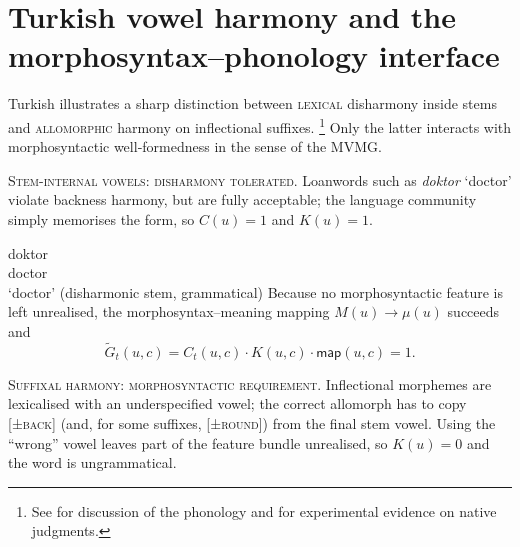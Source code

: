 \documentclass[12pt,letterpaper]{article}
\newcommand{\term}[1]{\textsc{#1}}
\newcommand{\mention}[1]{\textit{#1}}
\begin{document}
\newpage
\appendix

\section{Turkish vowel harmony and the morphosyntax--phonology interface}
\label{app:turkish-harmony}

Turkish illustrates a sharp distinction between \term{lexical} disharmony inside stems and
\term{allomorphic} harmony on inflectional suffixes.%
\footnote{See \autocite{Sezer1981,KabakVogel2001} for discussion of the phonology and \autocite{Arik2015} for experimental evidence on native judgments.} 
Only the latter interacts with morphosyntactic well‑formedness in the sense of the MVMG.

\textsc{Stem-internal vowels: disharmony tolerated.}
Loanwords such as \mention{doktor} `doctor' violate backness harmony, but are fully acceptable;
the language community simply memorises the form, so $C(u)=1$ and $K(u)=1$.

\ea \label{ex:doktor}
\gll doktor \\
     doctor\\
\glt `doctor' (disharmonic stem, grammatical)
\z
Because no morphosyntactic feature is left unrealised, the morphosyntax--meaning
mapping $\!M(u)\!\rightarrow\!\mu(u)$ succeeds and
\begin{equation*}
\widetilde{G}_t(u,c)=C_t(u,c)\cdot K(u,c)\cdot\mathsf{map}(u,c)=1.
\end{equation*}

\textsc{Suffixal harmony: morphosyntactic requirement.}
Inflectional morphemes are lexicalised with an underspecified vowel;
the correct allomorph has to copy \textsc{[±back]} (and, for some
suffixes, \textsc{[±round]}) from the final stem vowel.
Using the \enquote{wrong} vowel leaves part of the feature bundle unrealised,
so $K(u)=0$ and the word is ungrammatical.

\ea  \label{ex:kitap-pl}
\z
\z

\ea \label{ex:gul-past}
\z
\z
\end{document}

